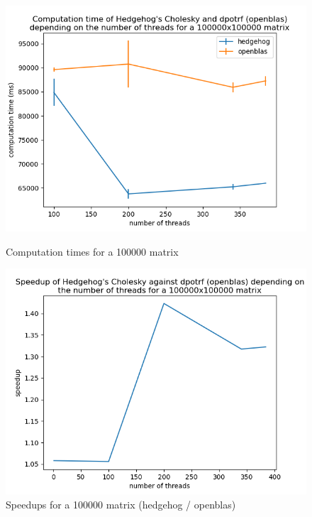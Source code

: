 \begin{figure}[!htb]
  \begin{minipage}{0.48\linewidth}
    \centering
    \includegraphics[scale=0.5]{img/times-100000.png}
    \caption{Computation times for a 100000 matrix}
    \label{fig:time100000}
  \end{minipage}\hfill
  \begin{minipage}{0.48\linewidth}
    \centering
    \includegraphics[scale=0.5]{img/speedup-100000.png}
    \caption{Speedups for a 100000 matrix (hedgehog / openblas)}
    \label{fig:speedups100000}
  \end{minipage}
\end{figure}


